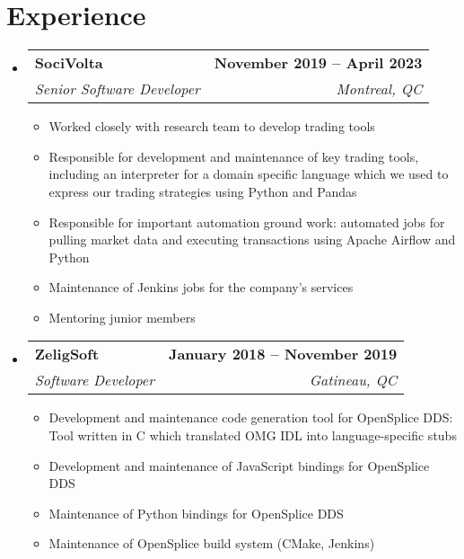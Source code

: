 \documentclass[letterpaper,11pt]{article}
\makeatletter
\newcommand{\resumeItem}[1]{
  \item\small{
    {#1 \vspace{-2pt}}
  }
}
\newcommand{\resumeSubheading}[4]{
  \vspace{-2pt}\item
    \begin{tabular*}{1.0\textwidth}[t]{l@{\extracolsep{\fill}}r}
      \textbf{#1} & \textbf{\small #2} \\
      \textit{\small#3} & \textit{\small #4} \\
    \end{tabular*}\vspace{-7pt}
}
\newcommand{\resumeSubHeadingListStart}{\begin{itemize}[leftmargin=0.0in, label={}]}
\newcommand{\resumeSubHeadingListEnd}{\end{itemize}}
\newcommand{\resumeItemListStart}{\begin{itemize}}
\newcommand{\resumeItemListEnd}{\end{itemize}\vspace{-5pt}}
\makeatother
\begin{document}
\section{Experience}
  \resumeSubHeadingListStart
    \resumeSubheading
      {SociVolta}{November 2019 -- April 2023}
      {Senior Software Developer}{Montreal, QC}
      \resumeItemListStart
        \resumeItem {Worked closely with research team to develop trading tools}
        \resumeItem {Responsible for development and maintenance of key trading tools, including an interpreter for a domain specific language which we used to express our trading strategies using Python and Pandas}
        \resumeItem {Responsible for important automation ground work: automated jobs for pulling market data and executing transactions using Apache Airflow and Python}
	\resumeItem {Maintenance of Jenkins jobs for the company's services}
	\resumeItem {Mentoring junior members}
    \resumeItemListEnd
      
    \resumeSubheading
      {ZeligSoft}{January 2018 -- November 2019}
      {Software Developer}{Gatineau, QC}
      \resumeItemListStart
        \resumeItem {Development and maintenance code generation tool for OpenSplice DDS: Tool written in C which translated OMG IDL into language-specific stubs}
        \resumeItem {Development and maintenance of JavaScript bindings for OpenSplice DDS}
        \resumeItem {Maintenance of Python bindings for OpenSplice DDS}
	\resumeItem {Maintenance of OpenSplice build system (CMake, Jenkins)}
    \resumeItemListEnd
    
  \resumeSubHeadingListEnd
\vspace{-5pt}
\end{document}
